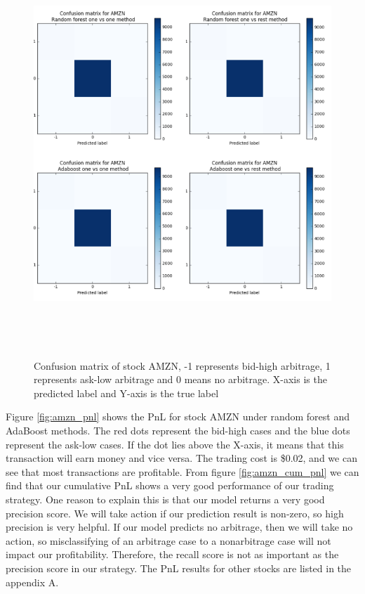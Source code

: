 \begin{figure} [hp]
  \begin{center}
    \includegraphics[width=6in,  height=6in]{figures/amzn_confusion_matrix.png}
  \end{center}
\caption{Confusion matrix of stock AMZN,   -1 represents bid-high arbitrage,   1 represents ask-low arbitrage and 0 means no arbitrage. X-axis is the predicted label and Y-axis is the true label} \label{fig:amzn_confusion_matrix}
\end{figure}


Figure \ref{fig:amzn_pnl} shows the PnL for stock AMZN under random forest and AdaBoost methods. The red dots represent the bid-high cases and the blue dots represent the ask-low cases. If the dot lies above the X-axis,  it means that this transaction will earn money and vice versa. The trading cost is \$0.02,   and we can see that most transactions are profitable. From figure \ref{fig:amzn_cum_pnl} we can find that our cumulative PnL shows a very good performance of our trading strategy. One reason to explain this is that our model returns a very good precision score. We will take action if our prediction result is non-zero,   so high precision is very helpful. If our model predicts no arbitrage,   then we will take no action,   so misclassifying of an arbitrage case to a nonarbitrage case will not impact our profitability. Therefore,   the recall score is not as important as the precision score in our strategy. The PnL results for other stocks are listed in the appendix A. 

